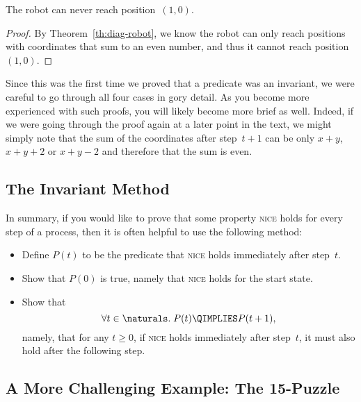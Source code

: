 \begin{corollary}\label{cor:diag-robot}
The robot can never reach position~$(1, 0)$.
\end{corollary}

\begin{proof}
By Theorem~\ref{th:diag-robot}, we know the robot can only reach
positions with coordinates that sum to an even number, and thus it
cannot reach position~$(1, 0)$.
\end{proof}

Since this was the first time we proved that a predicate was an
invariant, we were careful to go through all four cases in gory
detail.  As you become more experienced with such proofs, you will
likely become more brief as well.  Indeed, if we were going through
the proof again at a later point in the text, we might simply note
that the sum of the coordinates after step~$t + 1$ can be only $x +
y$, $x + y + 2$ or $x + y - 2$ and therefore that the sum is even.

\subsection{The Invariant Method}

In summary, if you would like to prove that some property
\textsc{nice} holds for every step of a process, then it is often
helpful to use the following method:
\begin{itemize}

\item
Define $P(t)$ to be the predicate that \textsc{nice} holds immediately
after step~$t$.

\item
Show that $P(0)$ is true, namely that \textsc{nice} holds for the
start state.

\item
Show that
\begin{equation*}
    \forall t \in \naturals. \; P(t) \QIMPLIES P(t + 1),
\end{equation*}
namely, that for any $t \ge 0$, if \textsc{nice} holds immediately
after step~$t$, it must also hold after the following step.

\end{itemize}

\subsection{A More Challenging Example: The
  15-Puzzle}\label{sec:15puzzle}

